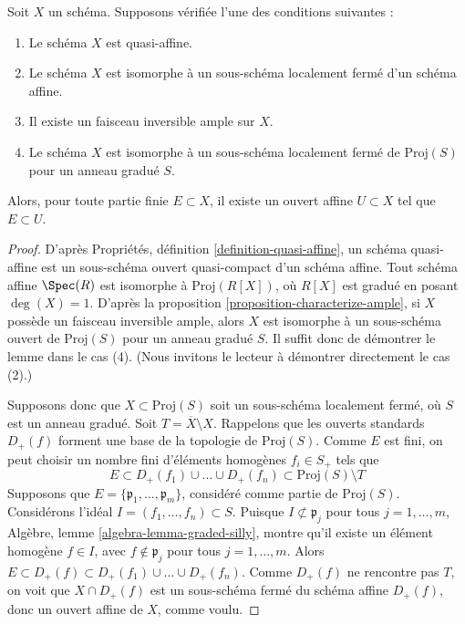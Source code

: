 \begin{lemma}
\label{lemma-ample-finite-set-in-affine}
Soit $X$ un schéma. Supposons vérifiée l'une des conditions suivantes :
\begin{enumerate}
\item Le schéma $X$ est quasi-affine.
\item Le schéma $X$ est isomorphe à un sous-schéma localement
fermé d'un schéma affine.
\item Il existe un faisceau inversible ample sur $X$.
\item Le schéma $X$ est isomorphe à un sous-schéma localement fermé
de $\text{Proj}(S)$ pour un anneau gradué $S$.
\end{enumerate}
Alors, pour toute partie finie $E \subset X$, il existe un
ouvert affine $U \subset X$ tel que $E \subset U$.
\end{lemma}

\begin{proof}
D'après Propriétés, définition \ref{definition-quasi-affine},
un schéma quasi-affine est un sous-schéma ouvert
quasi-compact d'un schéma affine. Tout schéma affine $\Spec(R)$ est isomorphe à
$\text{Proj}(R[X])$, où $R[X]$ est gradué en posant $\deg(X) = 1$.
D'après la proposition \ref{proposition-characterize-ample},
si $X$ possède un faisceau inversible ample, alors $X$ est isomorphe à un
sous-schéma ouvert de $\text{Proj}(S)$ pour un anneau gradué $S$.
Il suffit donc de démontrer le lemme dans le cas
(4). (Nous invitons le lecteur à démontrer directement le cas (2).)

\medskip\noindent
Supposons donc que $X \subset \text{Proj}(S)$ soit un sous-schéma localement
fermé, où $S$ est un anneau gradué. Soit $T = \overline{X} \setminus X$.
Rappelons que les ouverts standards $D_{+}(f)$ forment une base de la
topologie de $\text{Proj}(S)$. Comme $E$ est fini, on peut choisir un nombre fini
d'éléments homogènes $f_i \in S_{+}$ tels que
$$
E \subset
D_{+}(f_1) \cup \ldots \cup D_{+}(f_n) \subset
\text{Proj}(S) \setminus T
$$
Supposons que $E = \{\mathfrak p_1, \ldots, \mathfrak p_m\}$,
considéré comme partie de $\text{Proj}(S)$.
Considérons l'idéal $I = (f_1, \ldots, f_n) \subset S$.
Puisque $I \not \subset \mathfrak p_j$ pour tous $j = 1, \ldots, m$,
Algèbre, lemme \ref{algebra-lemma-graded-silly},
montre qu'il existe un élément homogène $f \in I$, avec $f \not \in \mathfrak p_j$
pour tous $j = 1, \ldots, m$. Alors $E \subset D_{+}(f) \subset
D_{+}(f_1) \cup \ldots \cup D_{+}(f_n)$. Comme $D_{+}(f)$ ne
rencontre pas $T$, on voit que $X \cap D_{+}(f)$ est un sous-schéma fermé du
schéma affine $D_{+}(f)$, donc un ouvert affine de $X$, comme voulu.
\end{proof}

